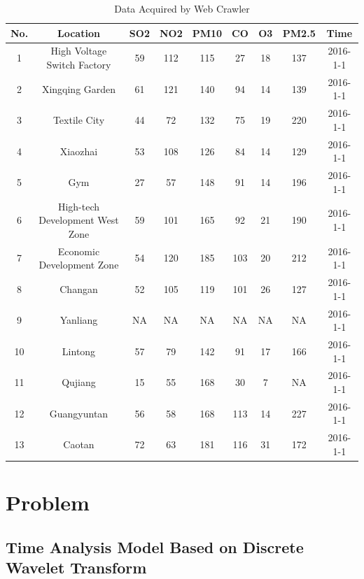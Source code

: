 \documentclass[a4paper,11pt]{article}
\begin{document}
\begin{table}[htbp]
  \centering
  \caption{Data Acquired by Web Crawler}
    \begin{tabular}{ccccccccc}
    \toprule
    No.   & Location & SO2   & NO2   & PM10  & CO    & O3    & PM2.5 & Time \\
    \midrule
    1     & High Voltage Switch Factory & 59    & 112   & 115   & 27    & 18    & 137   & 2016-1-1 \\
    2     & Xingqing Garden & 61    & 121   & 140   & 94    & 14    & 139   & 2016-1-1 \\
    3     & Textile City & 44    & 72    & 132   & 75    & 19    & 220   & 2016-1-1 \\
    4     & Xiaozhai & 53    & 108   & 126   & 84    & 14    & 129   & 2016-1-1 \\
    5     & Gym   & 27    & 57    & 148   & 91    & 14    & 196   & 2016-1-1 \\
    6     & High-tech Development West Zone & 59    & 101   & 165   & 92    & 21    & 190   & 2016-1-1 \\
    7     & Economic Development Zone & 54    & 120   & 185   & 103   & 20    & 212   & 2016-1-1 \\
    8     & Changan & 52    & 105   & 119   & 101   & 26    & 127   & 2016-1-1 \\
    9     & Yanliang & NA    & NA    & NA    & NA    & NA    & NA    & 2016-1-1 \\
    10    & Lintong & 57    & 79    & 142   & 91    & 17    & 166   & 2016-1-1 \\
    11    & Qujiang & 15    & 55    & 168   & 30    & 7     & NA    & 2016-1-1 \\
    12    & Guangyuntan & 56    & 58    & 168   & 113   & 14    & 227   & 2016-1-1 \\
    13    & Caotan & 72    & 63    & 181   & 116   & 31    & 172   & 2016-1-1 \\
    \bottomrule
    \end{tabular}%
  \label{tab:webcrawler}%
\end{table}%



\section{Problem \uppercase\expandafter{}}
\subsection{Time Analysis Model Based on Discrete Wavelet Transform}
\end{document}
